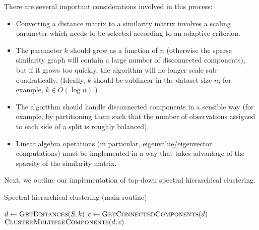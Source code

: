 \documentclass[11pt]{article}
\begin{document}
There are several important considerations involved in this process:
\begin{itemize}
    \item Converting a distance matrix to a similarity matrix involves a scaling parameter which needs to be selected according to an adaptive criterion.
    \item The parameter $k$ should grow as a function of $n$ (otherwise the sparse similarity graph will contain a large number of disconnected components), but if it grows too quickly, the algorithm will no longer scale sub-quadratically.  (Ideally, $k$ should be sublinear in the dataset size $n$; for example, $k \in O(\log n)$.)
    \item The algorithm should handle disconnected components in a sensible way (for example, by partitioning them such that the number of observations assigned to each side of a split is roughly balanced).
    \item Linear algebra operations (in particular, eigenvalue/eigenvector computations) must be implemented in a way that takes advantage of the sparsity of the similarity matrix.
\end{itemize}

Next, we outline our implementation of top-down spectral hierarchical clustering.

\newcommand{\algparbox}[2]{\parbox[t]{\dimexpr\linewidth-(\algorithmicindent * #1)\relax}{%
  \setlength{\hangindent}{\algorithmicindent}%
  #2}}

\begin{algorithm}
\caption{Spectral hierarchical clustering (main routine)}
\begin{algorithmic}
    \State $d \gets \Call{GetDistances}{S, k}$
    \State $c \gets \Call{GetConnectedComponents}{d}$
    \State \Return $\Call{ClusterMultipleComponents}{d, c}$
\EndFunction
\end{algorithmic}
\end{algorithm}
\end{document}
